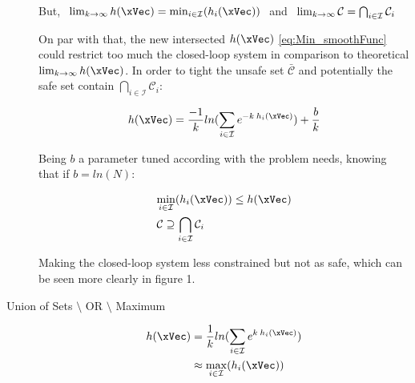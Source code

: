 \begin{description}
    But, \(\hspace{0.4em} \lim_{k \to \infty} h(\xVec) = {\min}_{i \in \mathcal{I}} (h_i(\xVec)) \hspace{0.4em}\) and \( \hspace{0.4em} \lim_{k \to \infty} \mathcal{C} = \bigcap_{i \in \mathcal{I}} \mathcal{C}_i\) \par

    On par with that, the new intersected  \(h(\xVec)\) \eqref{eq:Min_smoothFunc} could restrict too much the closed-loop system in comparison to theoretical  \( \lim_{k \to \infty} h(\xVec)\). In order to tight the unsafe set \(\bar{\mathcal{C}}\) and potentially the safe set contain \( \bigcap_{i \in \mathcal{I}} \mathcal{C}_i\): 
    
    \begin{equation}
        h(\xVec) = \frac{-1}{k}ln(\sum_{i \in \mathcal{I}} e^{-k \hspace{0.2em} h_i(\xVec)}) + \frac{b}{k}
        \label{eq:Min_smoothFunc_tighted} \\  
    \end{equation}



    Being \(b\) a parameter tuned according with the problem needs, knowing that if \(b = ln (N)\):

    \begin{subequations}
        \begin{align}
            &\underset{i \in \mathcal{I}}{\min} (h_i(\xVec)) \leq h(\xVec) %
            \label{eq:Intersection_CBF_Comparation_tighted} \\
            &\mathcal{C} \supseteq \bigcap_{i \in \mathcal{I}} \mathcal{C}_i
            \label{eq:Intersection_SafeSet_Comparation_tighted}
        \end{align}
    \end{subequations}

    Making the closed-loop system less constrained but not as safe, which can be seen more clearly in \cite{molnar2023composing} figure 1.

    \item[Union of Sets \(\setminus\) OR \(\setminus\) Maximum]

    \begin{align}
        h(\xVec) &= \frac{1}{k}ln(\sum_{i \in \mathcal{I}} e^{k \hspace{0.2em} h_i(\xVec)}) 
        \label{eq:Max_smoothFunc} \\
                 &\approx \underset{i \in \mathcal{I}}{\max} (h_i(\xVec))
        \notag  
    \end{align}


\end{description}
